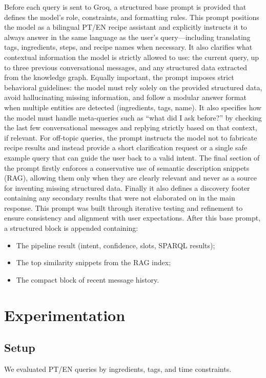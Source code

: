 \documentclass[conference]{IEEEtran}
\begin{document}
Before each query is sent to Groq, a structured base prompt is provided that defines the model’s role, constraints, and formatting rules. This prompt positions the model as a bilingual PT/EN recipe assistant and explicitly instructs it to always answer in the same language as the user’s query—including translating tags, ingredients, steps, and recipe names when necessary. It also clarifies what contextual information the model is strictly allowed to use: the current query, up to three previous conversational messages, and any structured data extracted from the knowledge graph. Equally important, the prompt imposes strict behavioral guidelines: the model must rely solely on the provided structured data, avoid hallucinating missing information, and follow a modular answer format when multiple entities are detected (ingredients, tags, name). It also specifies how the model must handle meta-queries such as “what did I ask before?” by checking the last few conversational messages and replying strictly based on that context, if relevant. For off-topic queries, the prompt instructs the model not to fabricate recipe results and instead provide a short clarification request or a single safe example query that can guide the user back to a valid intent. The final section of the prompt firstly enforces a conservative use of semantic description snippets (RAG), allowing them only when they are clearly relevant and never as a source for inventing missing structured data. Finally it also defines a discovery footer containing any secondary results that were not elaborated on in the main response. This prompt was built through iterative testing and refinement to ensure consistency and alignment with user expectations. After this base prompt, a structured block is appended containing:
\begin{itemize}
    \item The pipeline result (intent, confidence, slots, SPARQL results);
    \item The top similarity snippets from the RAG index;
    \item The compact block of recent message history.
\end{itemize}




\section{Experimentation}

\subsection{Setup}
We evaluated PT/EN queries by ingredients, tags, and time constraints.
\end{document}
